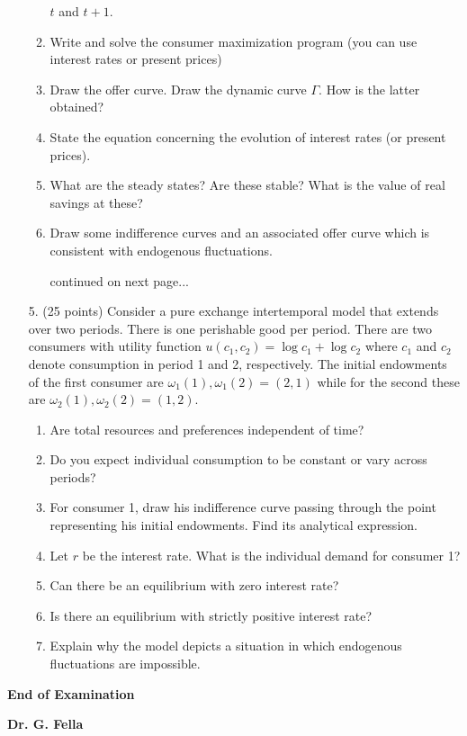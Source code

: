 \documentclass[a4paper,12pt]{article}
\begin{document}
\begin{enumerate}
\begin{enumerate}
   $t$ and $t+1$.
\item Write and solve the consumer maximization program (you can use interest rates or
   present prices)
\item Draw the offer curve. Draw the dynamic curve $\Gamma$. How is the latter obtained?
\item State the equation concerning the evolution of interest rates (or present prices).
\item What are the steady states? Are these stable? What is the value of real savings at
   these?
 \item Draw some indifference curves and an associated offer curve which
   is consistent with endogenous fluctuations.
\vfill
\begin{flushright}
continued on next page...
\end{flushright}
\end{enumerate}
%
\item [5.] (25 points) Consider a pure exchange intertemporal model that
  extends over two periods. There is one perishable good per period.
  There are two consumers with utility function $u(c_{1}, c_{2})=\log
  c_{1}+\log c_{2}$ where $c_{1}$ and $c_{2}$ denote consumption in
  period 1 and 2, respectively. The initial endowments of the first
  consumer are $\omega_1(1),\omega_1(2)=(2,1)$ while for the second
  these are $\omega_2(1),\omega_2(2)=(1,2)$.
\begin{enumerate}
	\item Are total resources and preferences independent of time?
  \item Do you expect individual consumption to be constant or vary across periods?
\item For consumer 1, draw his indifference curve passing through the point
representing his initial endowments. Find its analytical expression.
\item Let $r$ be the interest rate. What is the individual demand for consumer 1?
\item Can there be an equilibrium with zero interest rate?
\item Is there an equilibrium with strictly positive interest rate?
\item Explain why the model depicts a situation in which endogenous fluctuations
  are impossible.
\end{enumerate}
   
\end{enumerate}


\begin{flushright}
\textbf{End of Examination} 

\textbf{Dr. G. Fella}
\vspace{1em}
\end{flushright}
\end{document}
